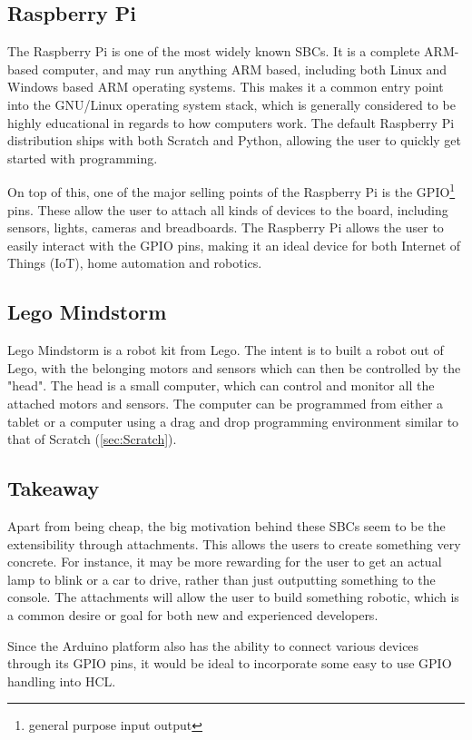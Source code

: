 \subsection{Raspberry Pi}
The Raspberry Pi is one of the most widely known SBCs. 
It is a complete ARM-based computer, and may run anything ARM based, including both Linux and Windows based ARM operating systems. 
This makes it a common entry point into the GNU/Linux operating system stack, which is generally considered to be highly educational in regards to how computers work.
The default Raspberry Pi distribution ships with both Scratch and Python, allowing the user to quickly get started with programming\cite{RaspberryPi}.

On top of this, one of the major selling points of the Raspberry Pi is the GPIO\footnote{general purpose input output} pins. 
These allow the user to attach all kinds of devices to the board, including sensors, lights, cameras and breadboards. 
The Raspberry Pi allows the user to easily interact with the GPIO pins, making it an ideal device for both Internet of Things (IoT), home automation and robotics\cite{RaspberryPi}.

\subsection{Lego Mindstorm}
Lego Mindstorm is a robot kit from Lego. 
The intent is to built a robot out of Lego, with the belonging motors and sensors which can then be controlled by the "head". 
The head is a small computer, which can control and monitor all the attached motors and sensors. 
The computer can be programmed from either a tablet or a computer using a drag and drop programming environment similar to that of Scratch (\ref{sec:Scratch})\cite{LegoMindstorms}.

\subsection{Takeaway}
Apart from being cheap, the big motivation behind these SBCs seem to be the extensibility through attachments. 
This allows the users to create something very concrete. 
For instance, it may be more rewarding for the user to get an actual lamp to blink or a car to drive, rather than just outputting something to the console. 
The attachments will allow the user to build something robotic, which is a common desire or goal for both new and experienced developers\cite{EducationalRobotics}.

Since the Arduino platform also has the ability to connect various devices through its GPIO pins, it would be ideal to incorporate some easy to use GPIO handling into HCL.
\fi
